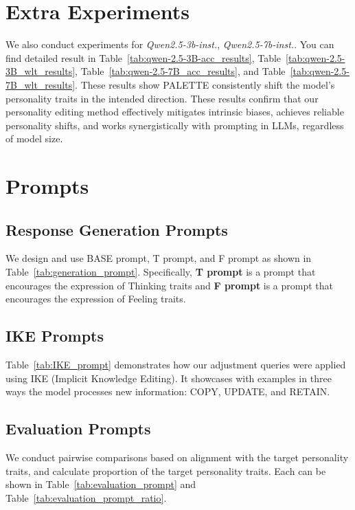 \appendix
\section{Extra Experiments}
\label{appendix:extra_experiments}
We also conduct experiments for  \textit{Qwen2.5-3b-inst.}, \textit{Qwen2.5-7b-inst.}. You can find detailed result in  Table~\ref{tab:qwen-2.5-3B-acc_results}, 
Table~\ref{tab:qwen-2.5-3B_wlt_results},  Table~\ref{tab:qwen-2.5-7B_acc_results}, and Table~\ref{tab:qwen-2.5-7B_wlt_results}. These results show PALETTE consistently shift the model’s personality traits in the intended direction. These results confirm that our personality editing method effectively mitigates intrinsic biases, achieves reliable personality shifts, and works synergistically with prompting in LLMs, regardless of model size.








\section{Prompts}
\label{appendix:prompts}


\subsection{Response Generation Prompts}
We design and use BASE prompt, T prompt, and F prompt as shown in Table~\ref{tab:generation_prompt}.
Specifically, \textbf{T prompt} is a prompt that encourages the expression of Thinking traits and \textbf{F prompt} is a prompt that encourages the expression of Feeling traits.  

\subsection{IKE Prompts}
Table~\ref{tab:IKE_prompt} demonstrates how our adjustment queries were applied using IKE (Implicit Knowledge Editing). It showcases with examples in three ways the model processes new information: COPY, UPDATE, and RETAIN.

\subsection{Evaluation Prompts}
We conduct pairwise comparisons based on alignment with the target personality traits, and calculate proportion of the target personality traits. Each can be shown in Table~\ref{tab:evaluation_prompt} and Table~\ref{tab:evaluation_prompt_ratio}.


